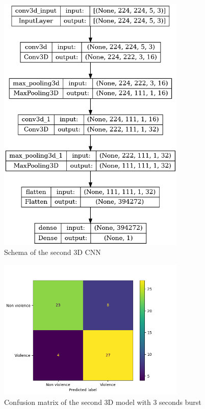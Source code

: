 \begin{figure}[]
    \centering
    \includegraphics[width=0.8\textwidth, height=0.6\textwidth, keepaspectratio]{images/3D9CNNschema.png}
    \caption{Schema of the second 3D CNN}
    \label{fig:3D3CNNschema}
\end{figure}


\begin{figure}[]
    \centering
    \includegraphics[width=0.8\textwidth]{images/71d5-testGiacomo3D3-9fcf-conf_matrix.png}
    \caption{Confusion matrix of the second 3D model with 3 seconds burst}
    \label{fig:Third3DCNNconfusionMatrix}
\end{figure}



